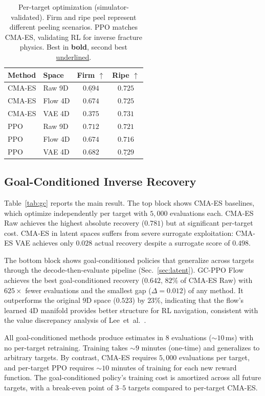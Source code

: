 \begin{table}[t]
\centering
\caption{Per-target optimization (simulator-validated). Firm and ripe peel represent different peeling scenarios. PPO matches CMA-ES, validating RL for inverse fracture physics. Best in \textbf{bold}, second best \underline{underlined}.}
\label{tab:per_target}
\small
\begin{tabular}{llcc}
\toprule
\textbf{Method} & \textbf{Space} & \textbf{Firm} $\uparrow$ & \textbf{Ripe} $\uparrow$ \\
\midrule
CMA-ES & Raw 9D & $\underline{0.694}$ & $0.725$ \\
CMA-ES & Flow 4D & $0.674$ & $0.725$ \\
CMA-ES & VAE 4D & $0.375$ & $\mathbf{0.731}$ \\
\midrule
PPO & Raw 9D & $\mathbf{0.712}$ & $0.721$ \\
PPO & Flow 4D & $0.674$ & $0.716$ \\
PPO & VAE 4D & $0.682$ & $\underline{0.729}$ \\
\bottomrule
\end{tabular}
\end{table}

\subsection{Goal-Conditioned Inverse Recovery}
\label{sec:gc_exp}

Table~\ref{tab:gc} reports the main result. The top block shows CMA-ES baselines, which optimize independently per target with $5{,}000$ evaluations each. CMA-ES Raw achieves the highest absolute recovery ($0.781$) but at significant per-target cost. CMA-ES in latent spaces suffers from severe surrogate exploitation: CMA-ES VAE achieves only $0.028$ actual recovery despite a surrogate score of $0.498$.

The bottom block shows goal-conditioned policies that generalize across targets through the decode-then-evaluate pipeline (Sec.~\ref{sec:latent}). GC-PPO Flow achieves the best goal-conditioned recovery ($0.642$, $82\%$ of CMA-ES Raw) with $625\times$ fewer evaluations and the smallest gap ($\Delta{=}0.012$) of any method. It outperforms the original $9$D space ($0.523$) by $23\%$, indicating that the flow's learned $4$D manifold provides better structure for RL navigation, consistent with the value discrepancy analysis of Lee~et~al.~\cite{lee2025nfbo}.

All goal-conditioned methods produce estimates in $8$ evaluations (${\sim}10$\,ms) with no per-target retraining. Training takes ${\sim}9$ minutes (one-time) and generalizes to arbitrary targets. By contrast, CMA-ES requires $5{,}000$ evaluations per target, and per-target PPO requires ${\sim}10$ minutes of training for each new reward function. The goal-conditioned policy's training cost is amortized across all future targets, with a break-even point of $3$--$5$ targets compared to per-target CMA-ES.

